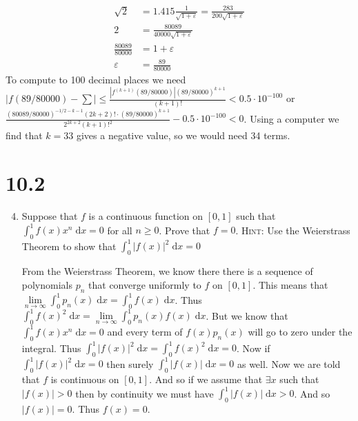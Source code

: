 \documentclass[letterpaper]{article}
\begin{document}
\begin{enumerate}
\begin{enumerate}
  \begin{align*}
    \sqrt{2}&=1.415\frac{1}{\sqrt{1+\varepsilon}}=\frac{283}{200\sqrt{1+\varepsilon}}\\
    2&=\frac{80089}{40000\sqrt{1+\varepsilon}}\\
    \frac{80089}{80000}&=1+\varepsilon\\
    \varepsilon&=\frac{89}{80000}
  \end{align*}
  To compute to 100 decimal places we need $\displaystyle |f(89/80000)-\sum|\le \frac{|f^{(k+1)}(89/80000)|(89/80000)^{k+1}}{(k+1)!}<0.5\cdot10^{-100}$ or $\displaystyle \frac{(80089/80000)^{-1/2-k-1}(2k+2)!\cdot(89/80000)^{k+1}}{2^{2k+2}(k+1)!^2}-0.5\cdot 10^{-100}<0$. Using a computer we find that $k=33$ gives a negative value, so we would need 34 terms.
  \end{enumerate}
\end{enumerate}
\section*{10.2}
\begin{enumerate}
\setcounter{enumi}{3}
\item
Suppose that $f$ is a continuous function on $[0,1]$ such that $\int_0^1{f(x)x^n\;\mathrm{d}x}=0$ for all $n\ge 0$. Prove that $f=0$. {\scshape Hint:} Use the Weierstrass Theorem to show that $\int_0^1{|f(x)|^2\;\mathrm{d}x}=0$

From the Weierstrass Theorem, we know there there is a sequence of polynomials $p_n$ that converge uniformly to $f$ on $[0,1]$. This means that $\lim\limits_{n\to\infty}\int_0^1{p_n(x)\;\mathrm{d}x}=\int_0^1{f(x)\;\mathrm{d}x}$. Thus $\int_0^1{f(x)^2\;\mathrm{d}x}=\lim\limits_{n\to\infty}\int_0^1{p_n(x)f(x)\;\mathrm{d}x}$. But we know that $\int_0^1{f(x)x^n\;\mathrm{d}x}=0$ and every term of $f(x)p_n(x)$ will go to zero under the integral. Thus $\int_0^1{|f(x)|^2\;\mathrm{d}x}=\int_0^1{f(x)^2\;\mathrm{d}x}=0$. Now if $\int_0^1{|f(x)|^2\;\mathrm{d}x}=0$ then surely $\int_0^1{|f(x)|\;\mathrm{d}x}=0$ as well. Now we are told that $f$ is continuous on $[0,1]$. And so if we assume that $\exists x$ such that $|f(x)|>0$ then by continuity we must have $\int_0^1{|f(x)|\;\mathrm{d}x}>0$. And so $|f(x)|=0$. Thus $f(x)=0$.
\end{enumerate}
\end{document}
